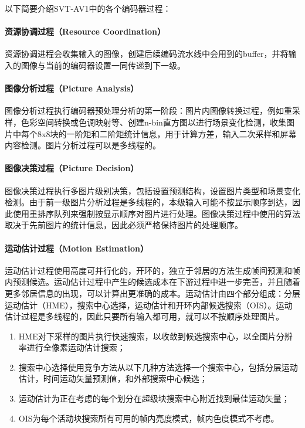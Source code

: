   以下简要介绍SVT-AV1中的各个编码器过程：
  \paragraph{资源协调过程（Resource Coordination）} 资源协调进程会收集输入的图像，创建后续编码流水线中会用到的buffer，并将输入的图像与当前的编码器设置一同传递到下一级。

  \paragraph{图像分析过程（Picture Analysis）} 图像分析过程执行编码器预处理分析的第一阶段：图片内图像转换过程，例如重采样，色彩空间转换或色调映射等、创建n-bin直方图以进行场景变化检测，收集图片中每个8x8块的一阶矩和二阶矩统计信息，用于计算方差，输入二次采样和屏幕内容检测。图片分析过程可以是多线程的。

  \paragraph{图像决策过程（Picture Decision）} 图像决策过程执行多图片级别决策，包括设置预测结构，设置图片类型和场景变化检测。由于前一级图片分析过程是多线程的，本级输入可能不按显示顺序到达，因此使用重排序队列来强制按显示顺序对图片进行处理。图像决策过程中使用的算法取决于先前图片的统计信息，因此必须严格保持图片的处理顺序。

  \paragraph{运动估计过程（Motion Estimation）} 运动估计过程使用高度可并行化的，开环的，独立于邻居的方法生成帧间预测和帧内预测候选。运动估计过程中产生的候选成本在下游过程中进一步完善，并且随着更多邻居信息的出现，可以计算出更准确的成本。运动估计由四个部分组成：分层运动估计（HME），搜索中心选择，运动估计和开环内部候选搜索（OIS）。运动估计过程是多线程的，因此只要所有输入都可用，就可以不按顺序处理图片。
  \begin{enumerate} [label=\arabic*)]
    \item HME对下采样的图片执行快速搜索，以收敛到候选搜索中心，以全图片分辨率进行全像素运动估计搜索；
    \item 搜索中心选择使用竞争方法从以下几种方法选择一个搜索中心，包括分层运动估计，时间运动矢量预测值，和外部搜索中心候选；
    \item 运动估计为正在考虑的每个划分在超级块搜索中心附近找到最佳运动矢量；
    \item OIS为每个活动块搜索所有可用的帧内亮度模式，帧内色度模式不考虑。
  \end{enumerate}

